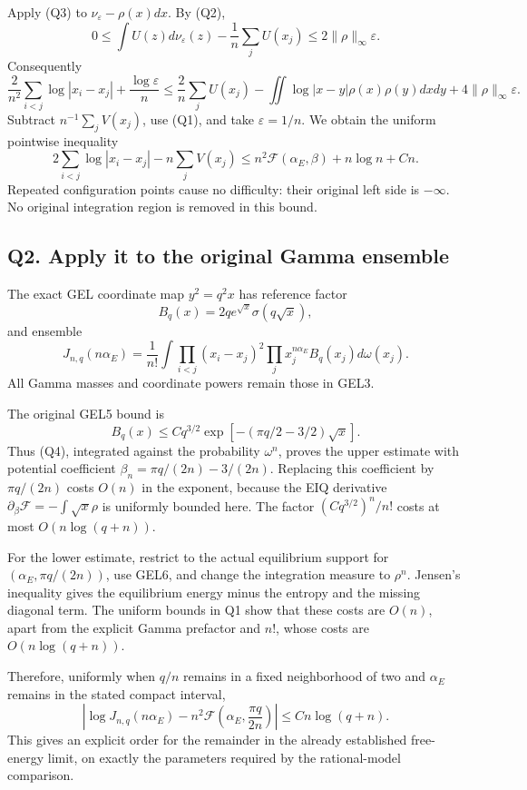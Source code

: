\documentclass[11pt,a4paper]{article}
\begin{document}
Apply (Q3) to \(\nu_\varepsilon-\rho(x)dx\). By (Q2), \[
0\le\int U(z)d\nu_\varepsilon(z)-\frac1n\sum_jU(x_j)
\le2\|\rho\|_\infty\varepsilon.
\] Consequently \[
\frac2{n^2}\sum_{i<j}\log|x_i-x_j|+\frac{\log\varepsilon}{n}
\le\frac2n\sum_jU(x_j)-\iint\log|x-y|\rho(x)\rho(y)dxdy
+4\|\rho\|_\infty\varepsilon.
\] Subtract \(n^{-1}\sum_jV(x_j)\), use (Q1), and take
\(\varepsilon=1/n\). We obtain the uniform pointwise inequality \[
\boxed{2\sum_{i<j}\log|x_i-x_j|-n\sum_jV(x_j)
\le n^2\mathcal F(\alpha_E,\beta)+n\log n+C n.}
\tag{Q4}
\] Repeated configuration points cause no difficulty: their original
left side is \(-\infty\). No original integration region is removed in
this bound.

\subsection{Q2. Apply it to the original Gamma
ensemble}\label{sa:q2.-apply-it-to-the-original-gamma-ensemble}

The exact GEL coordinate map \(y^2=q^2x\) has reference factor \[
B_q(x)=2q e^{\sqrt x}\sigma(q\sqrt x),
\] and ensemble \[
J_{n,q}(n\alpha_E)=\frac1{n!}\int\prod_{i<j}(x_i-x_j)^2
\prod_jx_j^{n\alpha_E}B_q(x_j)d\omega(x_j).
\tag{Q5}
\] All Gamma masses and coordinate powers remain those in GEL3.

The original GEL5 bound is \[
B_q(x)\le Cq^{3/2}\exp[-(\pi q/2-3/2)\sqrt x].
\] Thus (Q4), integrated against the probability \(\omega^n\), proves
the upper estimate with potential coefficient
\(\beta_n=\pi q/(2n)-3/(2n)\). Replacing this coefficient by
\(\pi q/(2n)\) costs \(O(n)\) in the exponent, because the EIQ
derivative \(\partial_\beta\mathcal F=-\int\sqrt x\rho\) is uniformly
bounded here. The factor \((Cq^{3/2})^n/n!\) costs at most
\(O(n\log(q+n))\).

For the lower estimate, restrict to the actual equilibrium support for
\((\alpha_E,\pi q/(2n))\), use GEL6, and change the integration measure
to \(\rho^n\). Jensen's inequality gives the equilibrium energy minus
the entropy and the missing diagonal term. The uniform bounds in Q1 show
that these costs are \(O(n)\), apart from the explicit Gamma prefactor
and \(n!\), whose costs are \(O(n\log(q+n))\).

Therefore, uniformly when \(q/n\) remains in a fixed neighborhood of two
and \(\alpha_E\) remains in the stated compact interval, \[
\boxed{\left|\log J_{n,q}(n\alpha_E)
-n^2\mathcal F\!\left(\alpha_E,\frac{\pi q}{2n}\right)\right|
\le C n\log(q+n).}
\tag{Q6}
\] This gives an explicit order for the remainder in the already
established free-energy limit, on exactly the parameters required by the
rational-model comparison.
\end{document}
